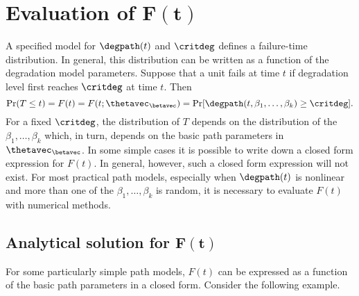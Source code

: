 \section{Evaluation of $\boldsymbol{F(t)}$}
\label{section:eval.of.ft}

A specified model for $\degpath(t)$ and $\critdeg$
defines a failure-time distribution. In
general, this distribution can be written as a function of the
degradation model parameters.  Suppose that a unit fails at time $t$
if degradation level first reaches $\critdeg$ at time $t$. Then
\begin{equation}
\label{equation:mixed.effect.to.ttf}
\Pr(T \leq t) = F(t) =
	F(t; \thetavec_{\betavec})= 
	\Pr[\degpath(t,\beta_{1},\dots,\beta_{k}) \geq  \critdeg ].  
\end{equation}
For a fixed $\critdeg$, the distribution of $T$ depends on the
distribution of the $\beta_{1},\dots,\beta_{k}$ which, in turn,
depends on the basic path parameters in $\thetavec_{\betavec}$. In
some simple cases it is possible to write down a closed form
expression for $F(t)$.  In general, however, such a closed form
expression will not exist.  For most practical path models,
especially when $\degpath(t)$ is nonlinear and more than one of the
$\beta_{1},\dots,\beta_{k}$ is random, it is necessary to evaluate
$F(t)$ with numerical methods.

\subsection{Analytical solution for $\boldsymbol{F(t)}$}
\label{section:evaluation.of.f.of.t}

For some particularly simple path
models, $F(t)$ can be expressed as a function of the basic
path parameters in a closed form.
Consider the following example.

